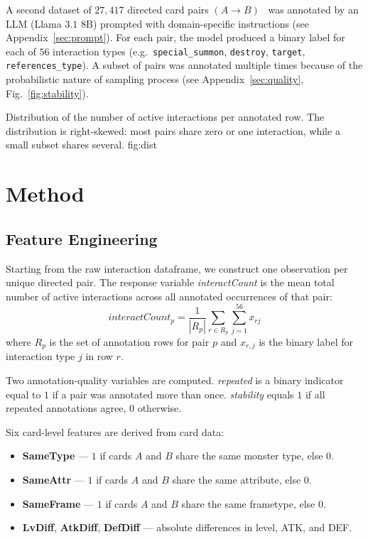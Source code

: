 \documentclass[10pt, a4paper]{article}
\begin{document}
A second dataset of $27{,}417$ directed card pairs
$(A \rightarrow B)$~\cite{ygo_interaction_data} was annotated by an
LLM (Llama $3.1$ $8$B) prompted with domain-specific instructions
(see Appendix~\ref{sec:prompt}). For each pair, the model produced a
binary label for each of $56$ interaction types
(e.g.\ \texttt{special\_summon}, \texttt{destroy}, \texttt{target},
\texttt{references\_type}). A subset of pairs was annotated multiple
times because of the probabilistic nature of sampling process (see Appendix~\ref{sec:quality}, 
Fig.~\ref{fig:stability}).

  {Distribution of the number of active interactions per annotated
   row. The distribution is right-skewed: most pairs share zero or
   one interaction, while a small subset shares several.}
  {fig:dist}

\section{Method}

\subsection{Feature Engineering}

Starting from the raw interaction dataframe, we construct one
observation per unique directed pair. The response variable
\textit{interactCount} is the mean total number of active
interactions across all annotated occurrences of that pair:
\begin{equation}
  \textit{interactCount}_{p}
    = \frac{1}{|R_p|}\sum_{r \in R_p}\sum_{j=1}^{56} x_{rj}
  \label{eq:ic}
\end{equation}
where $R_p$ is the set of annotation rows for pair $p$ and $x_{r,j}$
is the binary label for interaction type $j$ in row $r$.

Two annotation-quality variables are computed. \textit{repeated} is
a binary indicator equal to $1$ if a pair was annotated more than
once. \textit{stability} equals $1$ if all repeated annotations
agree, $0$ otherwise.

Six card-level features are derived from card data:
\begin{itemize}
  \item \textbf{SameType} --- $1$ if cards $A$ and $B$ share the same
        monster type, else $0$.
  \item \textbf{SameAttr} --- $1$ if cards $A$ and $B$ share the same
        attribute, else $0$.
  \item \textbf{SameFrame} --- $1$ if cards $A$ and $B$ share the same
        frametype, else $0$.
  \item \textbf{LvDiff}, \textbf{AtkDiff}, \textbf{DefDiff} ---
        absolute differences in level, ATK, and DEF.
\end{itemize}
\end{document}
